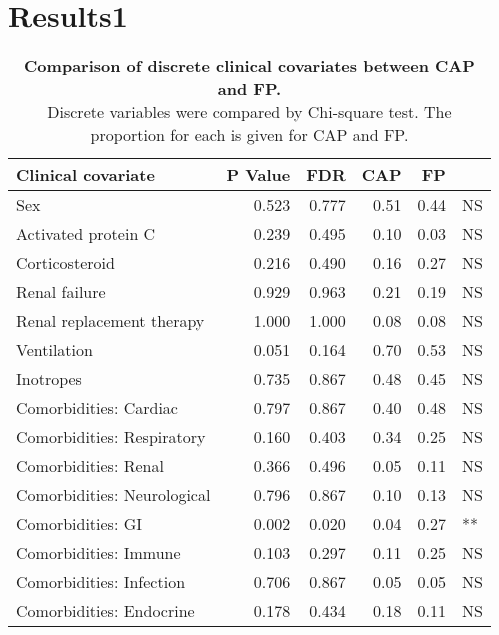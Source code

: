 \appendix
{}

\singlespacing

\chapter{Results1}\label{app:Results1}

\begin{center}

\begin{table}[htbp]
\begin{tabular}{@{} l r r r r l}
\toprule
\textbf{Clinical covariate} & \textbf{P Value}  & \textbf{FDR}  & \textbf{CAP} & \textbf{FP} & \\
\midrule
Sex                         & 0.523 & 0.777 & 0.51 & 0.44 & NS \\
Activated protein C         & 0.239 & 0.495 & 0.10 & 0.03 & NS \\
Corticosteroid              & 0.216 & 0.490 & 0.16 & 0.27 & NS \\
Renal failure               & 0.929 & 0.963 & 0.21 & 0.19 & NS \\
Renal replacement therapy   & 1.000 & 1.000 & 0.08 & 0.08 & NS \\
Ventilation                 & 0.051 & 0.164 & 0.70 & 0.53 & NS \\
Inotropes                   & 0.735 & 0.867 & 0.48 & 0.45 & NS \\
Comorbidities: Cardiac      & 0.797 & 0.867 & 0.40 & 0.48 & NS \\
Comorbidities: Respiratory  & 0.160 & 0.403 & 0.34 & 0.25 & NS \\
Comorbidities: Renal        & 0.366 & 0.496 & 0.05 & 0.11 & NS \\
Comorbidities: Neurological & 0.796 & 0.867 & 0.10 & 0.13 & NS \\
Comorbidities: GI           & 0.002 & 0.020 & 0.04 & 0.27 & ** \\
Comorbidities: Immune       & 0.103 & 0.297 & 0.11 & 0.25 & NS \\
Comorbidities: Infection    & 0.706 & 0.867 & 0.05 & 0.05 & NS \\
Comorbidities: Endocrine    & 0.178 & 0.434 & 0.18 & 0.11 & NS \\
\bottomrule
\end{tabular}
\medskip
\caption[Comparison of clinical covariates between CAP and FP]{\textbf{Comparison of discrete clinical covariates between CAP and FP.} \\ 
Discrete variables were compared by Chi-square test. The proportion for each is given for CAP and FP.}
\label{tab:CAPvsFPCovChi}
\end{table}
\bigskip


\end{center}
